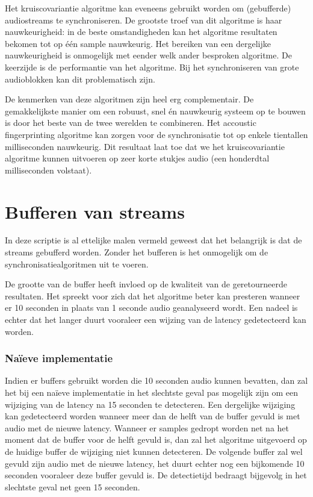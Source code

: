 Het kruiscovariantie algoritme kan eveneens gebruikt worden om (gebufferde) audiostreams te synchroniseren. De grootste troef van dit algoritme is haar nauwkeurigheid: in de beste omstandigheden kan het algoritme resultaten bekomen tot op één sample nauwkeurig. Het bereiken van een dergelijke nauwkeurigheid is onmogelijk met eender welk ander besproken algoritme. De keerzijde is de performantie van het algoritme. Bij het synchroniseren van grote audioblokken kan dit problematisch zijn.

De kenmerken van deze algoritmen zijn heel erg complementair. De gemakkelijkste manier om een robuust, snel én nauwkeurig systeem op te bouwen is door het beste van de twee werelden te combineren. Het accoustic fingerprinting algoritme kan zorgen voor de synchronisatie tot op enkele tientallen milliseconden nauwkeurig. Dit resultaat laat toe dat we het kruiscovariantie algoritme kunnen uitvoeren op zeer korte stukjes audio (een honderdtal milliseconden volstaat).

\section{Bufferen van streams}
\label{streambuffers}

In deze scriptie is al ettelijke malen vermeld geweest dat het belangrijk is dat de streams gebufferd worden. Zonder het bufferen is het onmogelijk om de synchronisatiealgoritmen uit te voeren. 

De grootte van de buffer heeft invloed op de kwaliteit van de geretourneerde resultaten. Het spreekt voor zich dat het algoritme beter kan presteren wanneer er 10 seconden in plaats van 1 seconde audio geanalyseerd wordt. Een nadeel is echter dat het langer duurt vooraleer een wijzing van de latency gedetecteerd kan worden. 

\subsubsection{Naïeve implementatie}

Indien er buffers gebruikt worden die 10 seconden audio kunnen bevatten, dan zal het bij een naïeve implementatie in het slechtste geval pas mogelijk zijn om een wijziging van de latency na 15 seconden te detecteren. Een dergelijke wijziging kan gedetecteerd worden wanneer meer dan de helft van de buffer gevuld is met audio met de nieuwe latency. Wanneer er samples gedropt worden net na het moment dat de buffer voor de helft gevuld is, dan zal het algoritme uitgevoerd op de huidige buffer de wijziging niet kunnen detecteren. De volgende buffer zal wel gevuld zijn audio met de nieuwe latency, het duurt echter nog een bijkomende 10 seconden vooraleer deze buffer gevuld is. De detectietijd bedraagt bijgevolg in het slechtste geval net geen 15 seconden.

